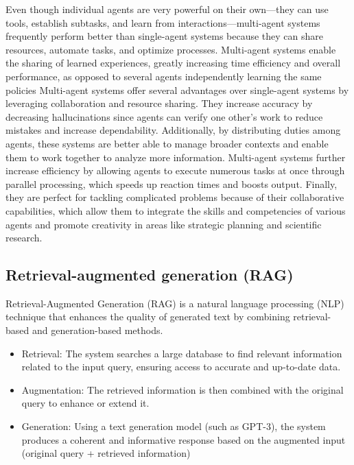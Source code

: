         Even though individual agents are very powerful on their own—they can use tools, establish subtasks, and learn from interactions—multi-agent systems frequently perform better than single-agent systems because they can share resources, automate tasks, and optimize processes. Multi-agent systems enable the sharing of learned experiences, greatly increasing time efficiency and overall performance, as opposed to several agents independently learning the same policies Multi-agent systems offer several advantages over single-agent systems by leveraging collaboration and resource sharing. They increase accuracy by decreasing hallucinations since agents can verify one other's work to reduce mistakes and increase dependability. Additionally, by distributing duties among agents, these systems are better able to manage broader contexts and enable them to work together to analyze more information. Multi-agent systems further increase efficiency by allowing agents to execute numerous tasks at once through parallel processing, which speeds up reaction times and boosts output. Finally, they are perfect for tackling complicated problems because of their collaborative capabilities, which allow them to integrate the skills and competencies of various agents and promote creativity in areas like strategic planning and scientific research.
        \cite{SuperAnnotate2}

    \subsection{Retrieval-augmented generation (RAG)}
    Retrieval-Augmented Generation (RAG) is a natural language processing (NLP) technique that enhances the quality of generated text by combining retrieval-based and generation-based methods.
    \cite{Martineau}
        \begin{itemize}
        \item  Retrieval: The system searches a large database to find relevant information related to the input query, ensuring access to accurate and up-to-date data.
        \item  Augmentation: The retrieved information is then combined with the original query to enhance or extend it.
        \item  Generation: Using a text generation model (such as GPT-3), the system produces a coherent and informative response based on the augmented input (original query + retrieved information)
        \end{itemize}

